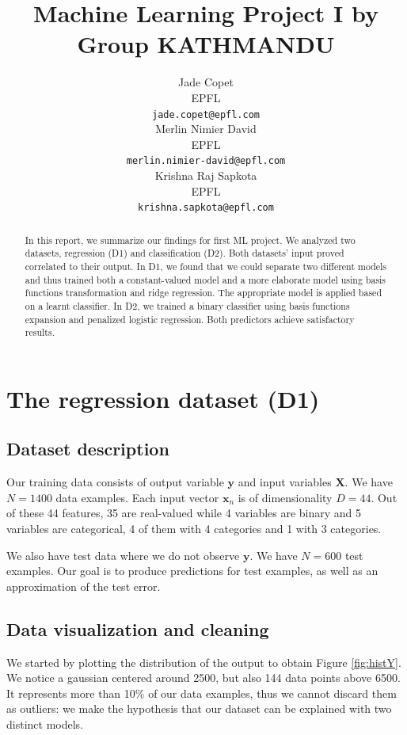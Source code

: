 \documentclass{article} %
\title{Machine Learning Project I by Group KATHMANDU}
\author{
Jade Copet\\
EPFL \\
\texttt{jade.copet@epfl.com} \\
\And
Merlin Nimier David\\
EPFL \\
\texttt{merlin.nimier-david@epfl.com} \\
\And
Krishna Raj Sapkota\\
EPFL \\
\texttt{krishna.sapkota@epfl.com} \\
}
\begin{document}
\maketitle



\begin{abstract}
  In this report, we summarize our findings for first ML project. We analyzed two datasets, regression (D1) and classification (D2). Both datasets' input proved correlated to their output. In D1, we found that we could separate two different models and thus trained both a constant-valued model and a more elaborate model using basis functions transformation and ridge regression. The appropriate model is applied based on a learnt classifier. In D2, we trained a binary classifier using basis functions expansion and penalized logistic regression. Both predictors achieve satisfactory results.
\end{abstract}



\section{The regression dataset (D1)}

  \subsection{Dataset description}
  Our training data consists of output variable $\mathbf{y}$ and input variables $\mathbf{X}$. We have $N = 1400$ data examples. Each input vector $\mathbf{x}_n$ is of dimensionality $D = 44$. Out of these 44 features, 35 are real-valued while 4 variables are binary and 5 variables are categorical, 4 of them with 4 categories and 1 with 3 categories.

  We also have test data where we do not observe $\mathbf{y}$. We have $N = 600$ test examples. Our goal is to produce predictions for test examples, as well as an approximation of the test error.

  \subsection{Data visualization and cleaning}
  We started by plotting the distribution of the output to obtain Figure \ref{fig:histY}. We notice a gaussian centered around 2500, but also 144 data points above 6500. It represents more than 10\% of our data examples, thus we cannot discard them as outliers: we make the hypothesis that our dataset can be explained with two distinct models.
\end{document}

